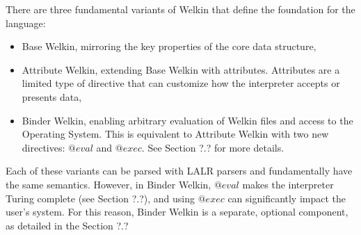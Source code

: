 There are three fundamental variants of Welkin that define the foundation for the language:
\begin{itemize}
	\item Base Welkin, mirroring the key properties of the core data structure,
	\item Attribute Welkin, extending Base Welkin with attributes. Attributes are a limited type of directive that can customize how the interpreter accepts or presents data,
	\item Binder Welkin, enabling arbitrary evaluation of Welkin files and access to the Operating System. This is equivalent to Attribute Welkin with two new directives: $@eval$ and $@exec.$ See Section ?.? for more details.
\end{itemize}
Each of these variants can be parsed with LALR parsers and fundamentally have the same semantics. However, in Binder Welkin, $@eval$ makes the interpreter Turing complete (see Section ?.?), and using $@exec$ can significantly impact the user's system. For this reason, Binder Welkin is a separate, optional component, as detailed in the Section ?.?
